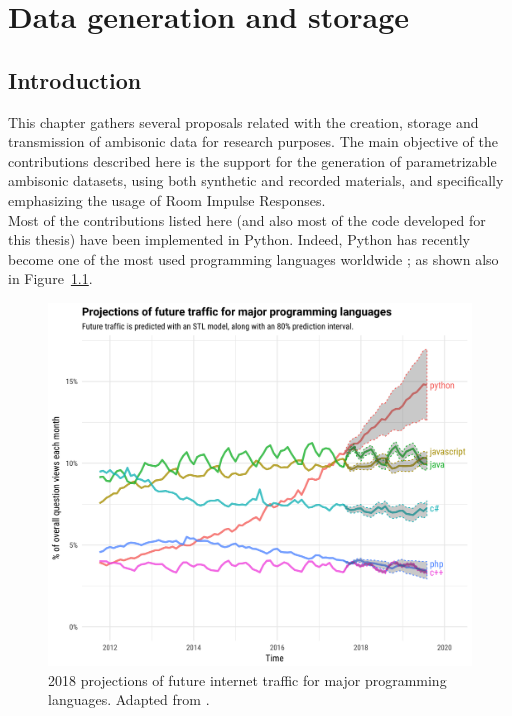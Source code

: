 \chapter{Data generation and storage}
\label{chap:data}

\section{Introduction}
\label{sec:intro_data}

This chapter gathers several proposals related with the creation, storage and transmission of ambisonic data for research purposes. The main objective of the contributions described here is the support for the generation of parametrizable ambisonic datasets, using both synthetic and recorded materials, and specifically emphasizing the usage of Room Impulse Responses.\\ 

Most of the contributions listed here (and also most of the code developed for this thesis) have been implemented in Python. Indeed, Python has recently become one of the most used programming languages worldwide \cite{theoverflow, PYPL, TIOBE}; as shown also in Figure~\ref{fig:popularity}.\\

\begin{figure}
\label{fig_architecture}
  \centering
    \includegraphics[width=\textwidth]{Figures/DataGeneration/projections-1-1400x1200.png}
    \caption{2018 projections of future internet traffic for major programming languages. Adapted from \cite{theoverflow}.}
    \label{fig:popularity}
\end{figure}



